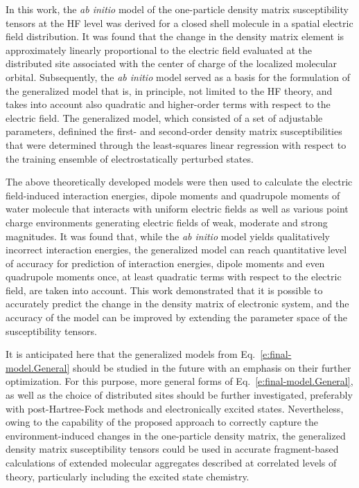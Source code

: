 \documentclass[aip,amsmath,amssymb,reprint,floatfix]{revtex4-1}
\begin{document}
In this work, the \emph{ab initio} model of the one\hyp{}particle density matrix susceptibility tensors
at the HF level was derived for a closed shell molecule in a spatial
electric field distribution. It was found that the change in the density matrix element
is approximately linearly proportional to the electric field evaluated at the distributed site associated with the 
center of charge of the 
localized molecular orbital. Subsequently, the \emph{ab initio} model served as a basis
for the formulation of the generalized model that is, in principle, not limited to the HF theory,
and takes into account also quadratic and higher\hyp{}order terms with respect to the electric field.
The generalized model, which consisted of a set of adjustable parameters,
definined the first\hyp{} and second\hyp{}order density matrix susceptibilities
that were determined through the least\hyp{}squares 
linear regression with respect to the training ensemble of electrostatically perturbed states.

The above theoretically developed models were then used to calculate the electric field\hyp{}induced
interaction energies, dipole moments and quadrupole moments of water molecule that
interacts with uniform electric fields as well as 
various point charge environments generating electric fields of weak, moderate
and strong magnitudes. It was found that, while the \emph{ab initio} model yields qualitatively incorrect
interaction energies, the generalized model can reach quantitative level of accuracy
for prediction of interaction energies, dipole moments and even quadrupole moments
once, at least quadratic terms with respect to the electric field, are taken into account. 
This work demonstrated that it is possible to
accurately predict the change in the density matrix of electronic system, and the accuracy of the model
can be improved by extending the parameter space of the susceptibility tensors. 

It is anticipated here that the generalized models from Eq.~\eqref{e:final-model.General}
should be studied in the future with an emphasis 
on their further optimization.
For this purpose, more general forms of Eq.~\eqref{e:final-model.General}, as well as the choice of distributed
sites should be further investigated, preferably with post\hyp{}Hartree\hyp{}Fock methods
and electronically excited states.
Nevertheless, owing to the capability of the proposed approach to correctly capture the 
environment\hyp{}induced changes in the one\hyp{}particle density matrix, 
the generalized density matrix susceptibility tensors 
could be used in accurate fragment\hyp{}based calculations of extended molecular aggregates
described at correlated levels of theory, particularly including the excited state chemistry.
\end{document}

